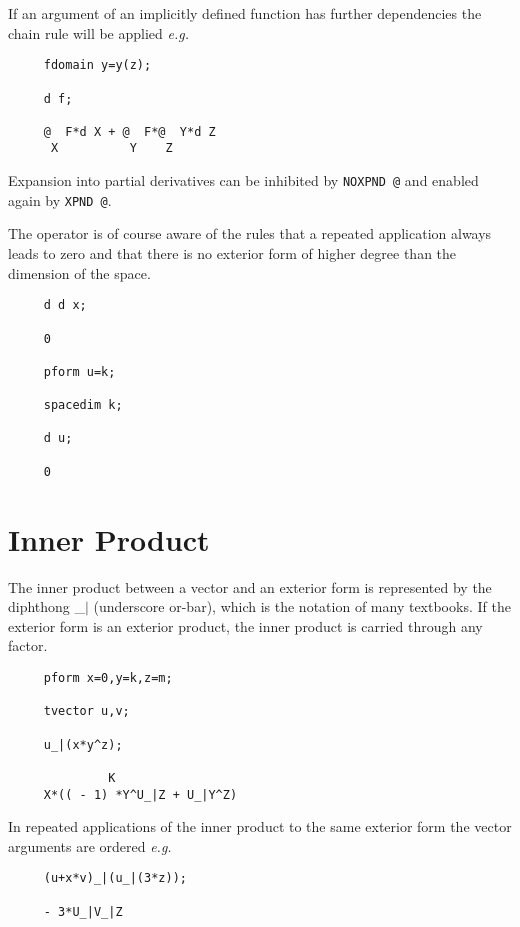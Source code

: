 If an argument of an implicitly defined function has further
dependencies the chain rule will be applied {\em e.g.} 
                                   

\begin{verbatim}
     fdomain y=y(z);

     d f;

     @  F*d X + @  F*@  Y*d Z
      X          Y    Z
\end{verbatim}

Expansion into partial derivatives can be inhibited by
{\tt NOXPND @}\label{NOXPNDA}
and enabled again by {\tt XPND @}\label{XPNDA}.
 

The operator is of course aware of the rules that a repeated
application always leads to zero and that there is no exterior form of
higher degree than the dimension of the space.

\begin{verbatim}
     d d x;

     0

     pform u=k;

     spacedim k;

     d u;

     0
\end{verbatim}

\section{Inner Product}
The inner product between a vector and an exterior form is represented
by the diphthong \_$|$ \label{innerp} (underscore or-bar), which is the
notation of many textbooks.  If the exterior form is an exterior
product, the inner product is carried through any factor.

\example{}

\begin{verbatim}
     pform x=0,y=k,z=m;

     tvector u,v;

     u_|(x*y^z);

              K
     X*(( - 1) *Y^U_|Z + U_|Y^Z)
\end{verbatim}

In repeated applications of the inner product to the same exterior
form the vector arguments are ordered {\em e.g.}

\begin{verbatim}
     (u+x*v)_|(u_|(3*z));

     - 3*U_|V_|Z
\end{verbatim}

